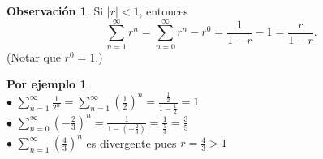 \documentclass{article}
\theoremstyle{definition}
\newtheorem*{obs}{Observación}
\newtheorem*{ej}{Por ejemplo}
\theoremstyle{remark}
\begin{document}
\begin{obs}
Si $|r|<1$, entonces $$\sum_{n=1}^{\infty}{r^n}=\sum_{n=0}^{\infty}{r^n}-r^0=\frac{1}{1-r}-1=\frac{r}{1-r}.$$
(Notar que $r^0=1$.)
\end{obs}
\begin{ej} \; \\
  $\bullet$ \; $\sum_{n=1}^{\infty}{\frac{1}{2^n}}=\sum_{n=1}^{\infty}{\left(\frac{1}{2}\right)^n}=\frac{\frac{1}{2}}{1-\frac{1}{2}}=1$ \\
  $\bullet$ \; $\sum_{n=0}^{\infty}{\left(-\frac{2}{3}\right)^n}=\frac{1}{1-\left(-\frac{2}{3}\right)}=\frac{1}{\frac{5}{3}}=\frac{3}{5}$ \\

  $ \bullet $ \; $\sum_{n=1}^{\infty}{\left(\frac{4}{3}\right)^n}$ es divergente pues $r=\frac{4}{3}>1$ 

\end{ej}
\end{document}
